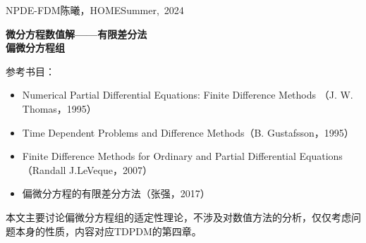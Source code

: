 \documentclass[a4paper,10pt]{ctexart}
\begin{document}
\hfill\vbox{\hbox{NPDE-FDM}\hbox{陈曦，HOME}\hbox{Summer, 2024}}

\begin{center}\Large
    \textbf{微分方程数值解——有限差分法}\\{\normalsize\bf {偏微分方程组}}
\end{center}
\vskip 30pt
\small {参考书目：
\begin{itemize}
    \item Numerical Partial Differential Equations: Finite Difference Methods （J. W. Thomas，1995）
    \item Time Dependent Problems and Difference Methods（B. Gustafsson，1995）
    \item Finite Difference Methods for Ordinary and Partial Differential Equations（Randall J.LeVeque，2007）
    \item 偏微分方程的有限差分方法（张强，2017）
\end{itemize}}
本文主要讨论偏微分方程组的适定性理论，不涉及对数值方法的分析，仅仅考虑问题本身的性质，内容对应TDPDM的第四章。
\end{document}
